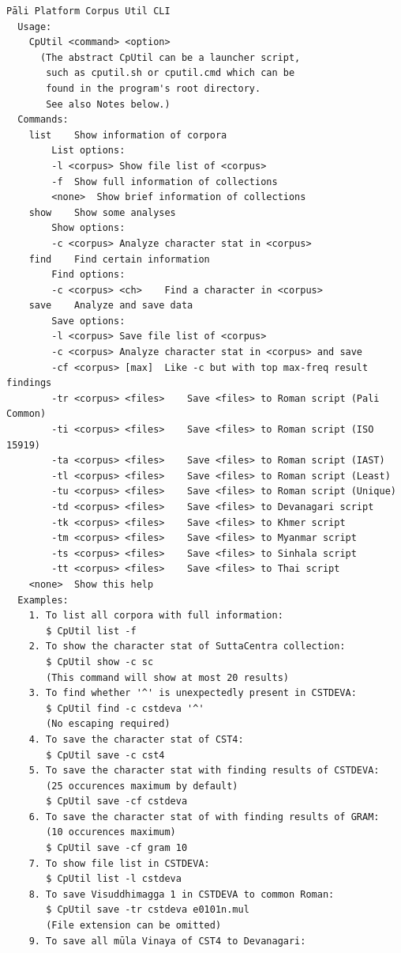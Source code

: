 {\footnotesize
\begin{verbatim}
Pāli Platform Corpus Util CLI
  Usage:
    CpUtil <command> <option>
      (The abstract CpUtil can be a launcher script,
       such as cputil.sh or cputil.cmd which can be
       found in the program's root directory.
       See also Notes below.)
  Commands:
    list	Show information of corpora
        List options:
        -l <corpus>	Show file list of <corpus>
        -f	Show full information of collections
        <none>	Show brief information of collections
    show	Show some analyses
        Show options:
        -c <corpus>	Analyze character stat in <corpus>
    find	Find certain information
        Find options:
        -c <corpus> <ch>	Find a character in <corpus>
    save	Analyze and save data
        Save options:
        -l <corpus>	Save file list of <corpus>
        -c <corpus>	Analyze character stat in <corpus> and save
        -cf <corpus> [max]	Like -c but with top max-freq result findings
        -tr <corpus> <files>	Save <files> to Roman script (Pali Common)
        -ti <corpus> <files>	Save <files> to Roman script (ISO 15919)
        -ta <corpus> <files>	Save <files> to Roman script (IAST)
        -tl <corpus> <files>	Save <files> to Roman script (Least)
        -tu <corpus> <files>	Save <files> to Roman script (Unique)
        -td <corpus> <files>	Save <files> to Devanagari script
        -tk <corpus> <files>	Save <files> to Khmer script
        -tm <corpus> <files>	Save <files> to Myanmar script
        -ts <corpus> <files>	Save <files> to Sinhala script
        -tt <corpus> <files>	Save <files> to Thai script
    <none>	Show this help
  Examples:
    1. To list all corpora with full information:
       $ CpUtil list -f
    2. To show the character stat of SuttaCentra collection:
       $ CpUtil show -c sc
       (This command will show at most 20 results)
    3. To find whether '^' is unexpectedly present in CSTDEVA:
       $ CpUtil find -c cstdeva '^'
       (No escaping required)
    4. To save the character stat of CST4:
       $ CpUtil save -c cst4
    5. To save the character stat with finding results of CSTDEVA:
       (25 occurences maximum by default)
       $ CpUtil save -cf cstdeva
    6. To save the character stat of with finding results of GRAM:
       (10 occurences maximum)
       $ CpUtil save -cf gram 10
    7. To show file list in CSTDEVA:
       $ CpUtil list -l cstdeva
    8. To save Visuddhimagga 1 in CSTDEVA to common Roman:
       $ CpUtil save -tr cstdeva e0101n.mul
       (File extension can be omitted)
    9. To save all mūla Vinaya of CST4 to Devanagari:

\end{verbatim}}
